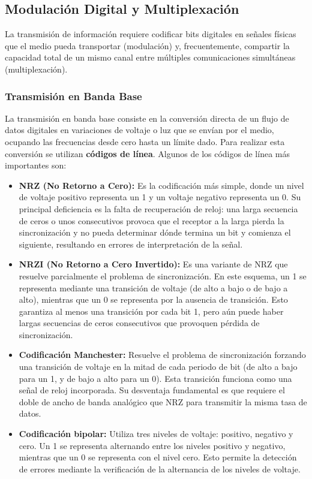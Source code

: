 \subsection{Modulación Digital y Multiplexación}

La transmisión de información requiere codificar bits digitales en señales físicas que el medio pueda transportar (modulación) y, frecuentemente, compartir la capacidad total de un mismo canal entre múltiples comunicaciones simultáneas (multiplexación).

\subsubsection{Transmisión en Banda Base}

La transmisión en banda base consiste en la conversión directa de un flujo de datos digitales en variaciones de voltaje o luz que se envían por el medio, ocupando las frecuencias desde cero hasta un límite dado. Para realizar esta conversión se utilizan \textbf{códigos de línea}. Algunos de los códigos de línea más importantes son:

\begin{itemize}
  \item \textbf{NRZ (No Retorno a Cero):} Es la codificación más simple, donde un nivel de voltaje positivo representa un 1 y un voltaje negativo representa un 0. Su principal deficiencia es la falta de recuperación de reloj: una larga secuencia de ceros o unos consecutivos provoca que el receptor a la larga pierda la sincronización y no pueda determinar dónde termina un bit y comienza el siguiente, resultando en errores de interpretación de la señal.
  \item \textbf{NRZI (No Retorno a Cero Invertido):} Es una variante de NRZ que resuelve parcialmente el problema de sincronización. En este esquema, un 1 se representa mediante una transición de voltaje (de alto a bajo o de bajo a alto), mientras que un 0 se representa por la ausencia de transición. Esto garantiza al menos una transición por cada bit 1, pero aún puede haber largas secuencias de ceros consecutivos que provoquen pérdida de sincronización.
  \item \textbf{Codificación Manchester:} Resuelve el problema de sincronización forzando una transición de voltaje en la mitad de cada periodo de bit (de alto a bajo para un 1, y de bajo a alto para un 0). Esta transición funciona como una señal de reloj incorporada. Su desventaja fundamental es que requiere el doble de ancho de banda analógico que NRZ para transmitir la misma tasa de datos.
  \item \textbf{Codificación bipolar:} Utiliza tres niveles de voltaje: positivo, negativo y cero. Un 1 se representa alternando entre los niveles positivo y negativo, mientras que un 0 se representa con el nivel cero. Esto permite la detección de errores mediante la verificación de la alternancia de los niveles de voltaje.
\end{itemize}

